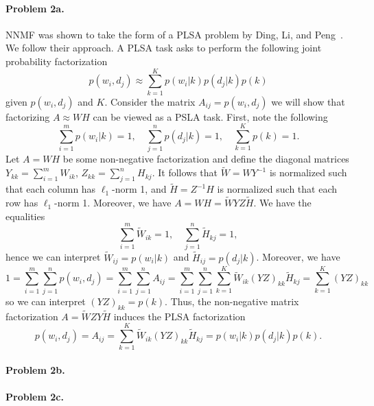 \documentclass[12pt]{article}
\begin{document}
\paragraph{Problem 2a.}
NNMF was shown to take the form of a PLSA problem by Ding, Li, and Peng~\cite{Ding2008}. We follow their approach.
A PLSA task asks to perform the following joint probability factorization \[p(w_i, d_j) \approx \sum_{k=1}^K p(w_i | k) p(d_j | k) p(k) \] given $p(w_i, d_j)$ and $K$. Consider the matrix $A_{ij} = p(w_i, d_j)$ we will show that factorizing $A \approx WH$ can be viewed as a PSLA task.
First, note the following \[ \sum_{i=1}^m p(w_i|k) = 1, \quad  \sum_{j=1}^n p(d_j|k) = 1, \quad \sum_{k=1}^K p(k) = 1.\]
Let $A=WH$ be some non-negative factorization and define the diagonal matrices $Y_{kk} = \sum_{i=1}^m W_{ik}$, $Z_{kk} = \sum_{j=1}^n H_{kj}$.
It follows that $\tilde{W} = WY^{-1}$ is normalized such that each column has $\ell_1$-norm 1, and $\tilde{H} = Z^{-1}H$ is normalized such that each row has $\ell_1$-norm 1. Moreover, we have $A = WH = \tilde{W} Y Z \tilde{H}$.
We have the equalities \[\sum_{i=1}^m \tilde{W}_{ik} = 1, \quad \sum_{j=1}^n \tilde{H}_{kj} = 1,\] hence we can interpret $\tilde{W}_{ij} = p(w_i|k)$ and $\tilde{H}_{ij} = p(d_j|k)$.
Moreover, we have \[1 = \sum_{i=1}^m \sum_{j=1}^n p(w_i, d_j) = \sum_{i=1}^m \sum_{j=1}^n A_{ij} = \sum_{i=1}^m \sum_{j=1}^n \sum_{k=1}^K \tilde{W}_{ik} \left( YZ \right)_{kk} \tilde{H}_{kj} = \sum_{k=1}^K \left(Y Z \right)_{kk}\] so we can interpret $(YZ)_{kk} = p(k)$.
Thus, the non-negative matrix factorization $A = \tilde{W} ZY \tilde{H}$ induces the PLSA factorization \[p(w_i, d_j) = A_{ij} = \sum_{k=1}^K \tilde{W}_{ik} \left(YZ \right)_{kk} \tilde{H}_{kj} = p(w_i|k)p(d_j|k)p(k). \]
\paragraph{Problem 2b.}
\paragraph{Problem 2c.}



\end{document}
